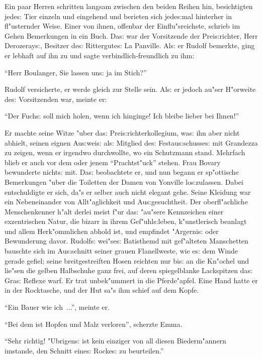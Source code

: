 \documentclass[oneside,12pt]{book}
\newcommand{\s}{s:}%
\begin{document}
Ein paar Herren schritten langsam zwischen den beiden Reihen hin,
besichtigten jede{\s} Tier einzeln und eingehend und berieten sich
jede{\s}mal hinterher in fl"usternder Weise. Einer von ihnen,
offenbar der Einflu"sreichste, schrieb im Gehen Bemerkungen in ein
Buch. Da{\s} war der Vorsitzende der Prei{\s}richter, Herr
Derozeray{\s}, Besitzer de{\s} Rittergute{\s} La Panville. Al{\s}
er Rudolf bemerkte, ging er lebhaft auf ihn zu und sagte
verbindlich-freundlich zu ihm:

"`Herr Boulanger, Sie lassen un{\s} ja im Stich?"'

Rudolf versicherte, er werde gleich zur Stelle sein. Al{\s} er
jedoch au"ser H"orweite de{\s} Vorsitzenden war, meinte er:

"`Der Fuch{\s} soll mich holen, wenn ich hinginge! Ich bleibe
lieber bei Ihnen!"'

Er machte seine Witze "uber da{\s} Prei{\s}richterkollegium,
wa{\s} ihn aber nicht abhielt, seinen eignen Au{\s}wei{\s} al{\s}
Mitglied de{\s} Festau{\s}schusse{\s} mit Grandezza zu zeigen,
wenn er irgendwo durchwollte, wo ein Schutzmann stand. Mehrfach
blieb er auch vor dem oder jenem "`Prachtst"uck"' stehen. Frau
Bovary bewunderte nicht{\s} mit. Da{\s} beobachtete er, und nun
begann er sp"ottische Bemerkungen "uber die Toiletten der Damen
von Yonville lo{\s}zulassen. Dabei entschuldigte er sich, da"s er
selber auch nicht elegant gehe. Seine Kleidung war ein
Nebeneinander von Allt"aglichkeit und Au{\s}gesuchtheit. Der
oberfl"achliche Menschenkenner h"alt derlei meist f"ur da{\s}
"au"sere Kennzeichen einer exzentrischen Natur, die bizarr in
ihrem Gef"uhl{\s}leben, k"unstlerisch beanlagt und allem
Herk"ommlichen abhold ist, und empfindet "Argerni{\s} oder
Bewunderung davor. Rudolf{\s} wei"se{\s} Batisthemd mit
gef"alteten Manschetten bauschte sich im Au{\s}schnitt seiner
grauen Flanellweste, wie e{\s} dem Winde gerade gefiel; seine
breitgestreiften Hosen reichten nur bi{\s} an die Kn"ochel und
lie"sen die gelben Halbschuhe ganz frei, auf deren spiegelblanke
Lackspitzen da{\s} Gra{\s} Reflexe warf. Er trat unbek"ummert in
die Pferde"apfel. Eine Hand hatte er in der Rocktasche, und der
Hut sa"s ihm schief auf dem Kopfe.

"`Ein Bauer wie ich~..."', meinte er.

"`Bei dem ist Hopfen und Malz verloren"', scherzte Emma.

"`Sehr richtig! "Ubrigen{\s} ist kein einziger von all diesen
Biederm"annern imstande, den Schnitt eine{\s} Rocke{\s} zu
beurteilen."'
\end{document}

